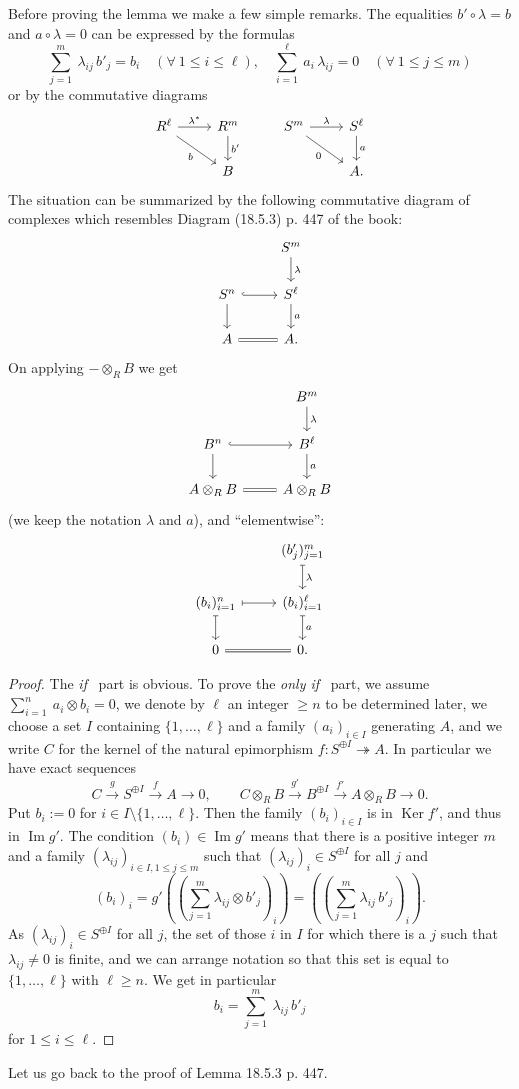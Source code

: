\documentclass[12pt]{article}
\theoremstyle{remark}
\theoremstyle{definition}
\newcommand{\epi}{\twoheadrightarrow}
\newcommand{\xr}{\xrightarrow}
\DeclareMathOperator{\Ima}{Im}
\DeclareMathOperator{\Ker}{Ker}
\begin{document}
Before proving the lemma we make a few simple remarks. The equalities $b'\circ\lambda=b$ and $a\circ\lambda=0$ can be expressed by the formulas
$$
\sum_{j=1}^m\ \lambda_{ij}\,b'_j=b_i\quad(\forall\ 1\le i\le\ell),\quad
\sum_{i=1}^\ell\ a_i\,\lambda_{ij}=0\quad(\forall\ 1\le j\le m)
$$
or by the commutative diagrams
$$
\begin{tikzcd}
R^\ell\ar{r}{\lambda^*}\ar{rd}[swap]{b}&R^m\ar{d}{b'}&
S^m\ar{r}{\lambda}\ar{rd}[swap]{0}&S^\ell\ar{d}{a}
\\ 
{}&B&{}&A.
\end{tikzcd}
$$ 
The situation can be summarized by the following commutative diagram of complexes which resembles Diagram (18.5.3) p. 447 of the book:
$$
\begin{tikzcd}
{}&S^m\ar{d}{\lambda}\\ 
S^n\ar[hook]{r}\ar{d}&S^\ell\ar{d}{a}\\ 
A\ar[equal]{r}&A.
\end{tikzcd}
$$ 
On applying $-\otimes_RB$ we get 
$$
\begin{tikzcd}
{}&B^m\ar{d}{\lambda}\\ 
B^n\ar[hook]{r}\ar{d}&B^\ell\ar{d}{a}\\ 
A\otimes_RB\ar[equal]{r}&A\otimes_RB
\end{tikzcd}
$$ 
(we keep the notation $\lambda$ and $a$), and ``elementwise'':
\begin{equation}\label{eltwise}
\begin{tikzcd}
{}&(b'_j)_{j=1}^m\ar[mapsto]{d}{\lambda}\\ 
(b_i)_{i=1}^n\ar[mapsto]{r}\ar[mapsto]{d}&(b_i)_{i=1}^\ell\ar[mapsto]{d}{a}\\ 
0\ar[equal]{r}&0.
\end{tikzcd}
\end{equation}
\begin{proof}
The {\em if} \ part is obvious. To prove the {\em only if} \ part, we assume $\sum_{i=1}^n\ a_i\otimes b_i=0$, we denote by $\ell$ an integer $\ge n$ to be determined later, we choose a set $I$ containing $\{1,\dots,\ell\}$ and a family $(a_i)_{i\in I}$ generating $A$, and we write $C$ for the kernel of the natural epimorphism $f:S^{\oplus I}\epi A$. In particular we have exact sequences 
$$
C\xr gS^{\oplus I}\xr fA\to0,\qquad C\otimes_RB\xr{g'}B^{\oplus I}\xr{f'}A\otimes_RB\to0.
$$ 
Put $b_i:=0$ for $i\in I\setminus\{1,\dots,\ell\}$. Then the family $(b_i)_{i\in I}$ is in $\Ker f'$, and thus in $\Ima g'$. The condition $(b_i)\in\Ima g'$ means that there is a positive integer $m$ and a family $(\lambda_{ij})_{i\in I,1\le j\le m}$ such that $(\lambda_{ij})_i\in S^{\oplus I}$ for all $j$ and 
$$
(b_i)_i=g'
\left(\left(\sum_{j=1}^m\lambda_{ij}\otimes b'_j\right)_i\right)=
\left(\left(\sum_{j=1}^m\lambda_{ij}\,b'_j\right)_i\right).
$$ 
As $(\lambda_{ij})_i\in S^{\oplus I}$ for all $j$, the set of those $i$ in $I$ for which there is a $j$ such that $\lambda_{ij}\neq0$ is finite, and we can arrange notation so that this set is equal to $\{1,\dots,\ell\}$ with $\ell\ge n$. We get in particular  
$$
b_i=\sum_{j=1}^m\ \lambda_{ij}\,b'_j
$$ 
for $1\le i\le\ell$.
\end{proof}
%
Let us go back to the proof of Lemma 18.5.3 p. 447.
\end{document}
